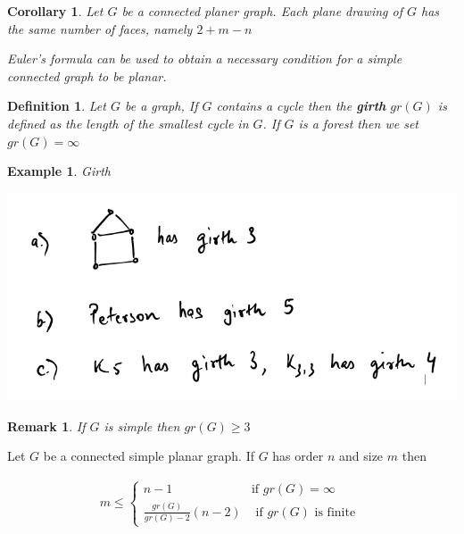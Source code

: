 \documentclass[12pt]{article}
\newenvironment{theorem}[1]{%
  \renewcommand\themanualtheoreminner{#1}%
  \manualtheoreminner
}{\endmanualtheoreminner}
\newtheorem*{corollary}{Corollary}
\newtheorem{example}{Example}
\newtheorem{definition}{Definition}
\newtheorem*{remark}{Remark}
\begin{document}
\begin{corollary}

	Let $G$ be a connected planer graph. Each plane drawing of $G$ has the same number of faces, namely $2+m - n$

	Euler's formula can be used to obtain a necessary condition for a simple connected graph to be planar.
\end{corollary}

\begin{definition}
	Let $G$ be a graph, If $G$ contains a cycle then the \textbf{girth} $gr(G)$ is defined as the length of the smallest cycle in $G$. If $G$ is a forest then we set $gr(G) = \infty$
\end{definition}

\begin{example}
	Girth
	\begin{center}
		\includegraphics[scale=0.5]{example}
	\end{center}
\end{example}


\begin{remark}
	If $G$ is simple then $gr(G) \ge 3$
\end{remark}


\begin{theorem}{4}
	Let $G$ be a connected simple planar graph. If $G$ has order $n$ and size $m$ then

	\begin{align} m \le \begin{cases} n-1                          & \text{if } gr(G) = \infty             \\
              \frac{gr(G)}{gr(G) - 2}(n-2) & \text{ if  } gr(G) \text{ is finite }\end{cases}
	\end{align}
\end{theorem}
\end{document}
